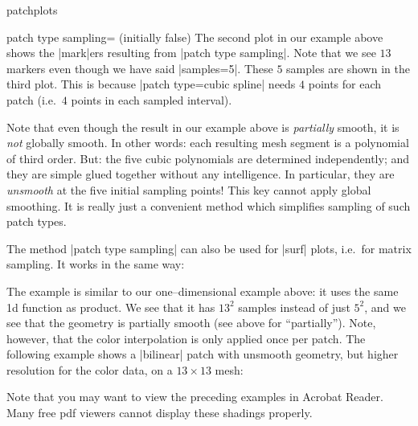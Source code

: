 {\begin{pgfplotslibrary}{patchplots}
\begin{pgfplotskey}{patch type sampling= (initially false)}
	The second plot in our example above shows the |mark|ers resulting from |patch type sampling|. Note that we see $13$ markers even though we have said |samples=5|. These $5$ samples are shown in the third plot. This is because |patch type=cubic spline| needs $4$ points for each patch (i.e.\ $4$ points in each sampled interval).

	Note that even though the result in our example above is \emph{partially} smooth, it is \emph{not} globally smooth. In other words: each resulting mesh segment is a polynomial of third order. But: the five cubic polynomials are determined independently; and they are simple glued together without any intelligence. In particular, they are \emph{unsmooth} at the five initial sampling points! This key cannot apply global smoothing. It is really just a convenient method which simplifies sampling of such patch types.

	The method |patch type sampling| can also be used for |surf| plots, i.e.\ for matrix sampling. It works in the same way:
\begin{codeexample}[]
\end{codeexample}
	The example is similar to our one--dimensional example above: it uses the same 1d function as product. We see that it has $13^2$ samples instead of just $5^2$, and we see that the geometry is partially smooth (see above for ``partially''). Note, however, that the color interpolation is only applied once per patch. The following example shows a |bilinear| patch with unsmooth geometry, but higher resolution for the color data, on a $13\times13$ mesh:
\begin{codeexample}[]
\end{codeexample}
	Note that you may want to view the preceding examples in Acrobat Reader. Many free pdf viewers cannot display these shadings properly.
\end{pgfplotskey}


\end{pgfplotslibrary}}
